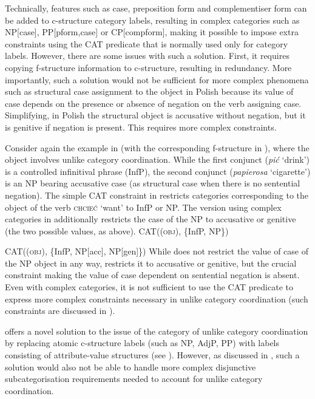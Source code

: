 \documentclass[output=paper]{../langscibook}
\begin{document}
Technically, features such as case, preposition form and
complementiser form can be added to c-structure category labels,
resulting in complex categories such as NP[case],
PP[pform,case] or CP[compform], making it possible to impose extra
constraints using the CAT predicate that is normally used only for
category labels. However, there are some issues with such a solution.
First, it requires copying f-structure information to
c-structure, resulting in redundancy. More importantly, such a
solution would not be sufficient for more complex phenomena such as
structural case assignment to the object in Polish because its value of
case depends on the presence or absence of negation on the verb
assigning case. Simplifying, in Polish the structural object is accusative
without negation, but it is genitive if negation is present. This
requires more complex constraints.

Consider again the example in  (with the
corresponding f-structure in ), where the
object involves unlike category coordination. While the first conjunct
(\emph{pić} `drink')
is a controlled infinitival phrase (InfP), the second conjunct
(\emph{papierosa} `cigarette') is an NP
bearing accusative case (as structural case when there is no sentential negation).
%
The simple CAT constraint in  restricts categories
corresponding to the object of the verb \textsc{chcieć} `want' to
InfP or NP. The version using complex categories in  additionally restricts the case of the
NP to accusative or genitive (the two possible values, as above).
\ea\label{ex:CAT:simple} CAT((\UP \textsc{obj}), \{InfP, NP\})
  \item\label{ex:CAT:cpx} CAT((\UP \textsc{obj}), \{InfP, NP[acc], NP[gen]\})
\z
While  does not restrict the value of case of the
NP object in any way,  restricts it to accusative or
genitive, but the crucial constraint making the value of case dependent
on sentential negation is absent. Even with complex categories, it is
not sufficient to use the CAT predicate to express more complex constraints
necessary in unlike category coordination (such constraints are discussed in ).

\citet{dalr:17} offers a novel solution to the issue of the
category of unlike category coordination by replacing atomic
c-structure labels (such as NP, AdjP, PP) with
labels consisting of attribute-value structures (see
). However, as discussed in
\citet{PP2021}, such a solution would also not be able to
handle more complex disjunctive subcategorisation requirements needed
to account for unlike category coordination.
\end{document}
